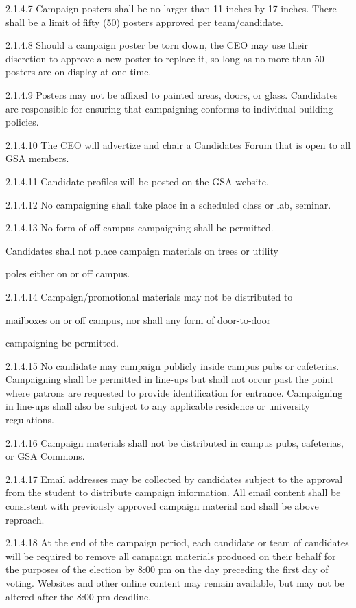  2.1.4.7 Campaign posters shall be no larger than 11 inches by 17 inches. 
 There shall be a limit of fifty (50) posters approved per 
 team/candidate. 
 
 2.1.4.8 Should a campaign poster be torn down, the CEO may use their 
 discretion to approve a new poster to replace it, so long as no 
 more than 50 posters are on display at one time. 
 
 2.1.4.9 Posters may not be affixed to painted areas, doors, or glass. 
 Candidates are responsible for ensuring that campaigning 
 conforms to individual building policies. 
 
 2.1.4.10 The CEO will advertize and chair a Candidates Forum that is 
 open to all GSA members. 
 
 2.1.4.11 Candidate profiles will be posted on the GSA website. 
 
 2.1.4.12 No campaigning shall take place in a scheduled class or lab, 
 seminar. 
 
 2.1.4.13 No form of off-campus campaigning shall be permitted. 
 
 Candidates shall not place campaign materials on trees or utility 
 
 poles either on or off campus. 
 
 2.1.4.14 Campaign/promotional materials may not be distributed to 
 
 mailboxes on or off campus, nor shall any form of door-to-door 
 
 campaigning be permitted. 
 
 2.1.4.15 No candidate may campaign publicly inside campus pubs or 
 cafeterias. Campaigning shall be permitted in line-ups but shall 
 not occur past the point where patrons are requested to provide 
 identification for entrance. Campaigning in line-ups shall also be 
 subject to any applicable residence or university regulations. 
 
 2.1.4.16 Campaign materials shall not be distributed in campus pubs, 
 cafeterias, or GSA Commons. 
 
 2.1.4.17 Email addresses may be collected by candidates subject to the 
 approval from the student to distribute campaign information. All 
 email content shall be consistent with previously approved 
 campaign material and shall be above reproach. 
 
 2.1.4.18 At the end of the campaign period, each candidate or team of 
 candidates will be required to remove all campaign materials 
 produced on their behalf for the purposes of the election by 8:00 
 pm on the day preceding the first day of voting. Websites and 
 other online content may remain available, but may not be altered 
 after the 8:00 pm deadline. 
 
